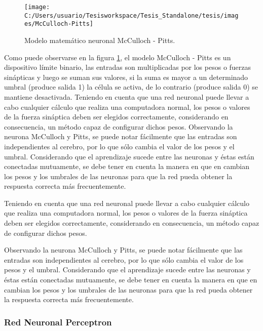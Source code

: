 \begin{figure}
\begin{centering}
\texttt{[image: C:/Users/usuario/Tesisworkspace/Tesis\_Standalone/tesis/images/McCulloch-Pitts]}
\par\end{centering}

\caption{Modelo matemático neuronal McCulloch - Pitts. \label{fig:McCulloch-Pitts}}
\end{figure}


Como puede observarse en la figura \ref{fig:McCulloch-Pitts}, el
modelo McCulloch - Pitts es un dispositivo límite binario, las entradas
son multiplicadas por los pesos o fuerzas sinápticas y luego se suman
sus valores, si la suma es mayor a un determinado umbral (produce
salida 1) la célula se activa, de lo contrario (produce salida 0)
se mantiene desactivada. Teniendo en cuenta que una red neuronal puede
llevar a cabo cualquier cálculo que realiza una computadora normal,
los pesos o valores de la fuerza sináptica deben ser elegidos correctamente,
considerando en consecuencia, un método capaz de configurar dichos
pesos. Observando la neurona McCulloch y Pitts, se puede notar fácilmente
que las entradas son independientes al cerebro, por lo que sólo cambia
el valor de los pesos y el umbral. Considerando que el aprendizaje
sucede entre las neuronas y éstas están conectadas mutuamente, se
debe tener en cuenta la manera en que en cambian los pesos y los umbrales
de las neuronas para que la red pueda obtener la respuesta correcta
más frecuentemente.

Teniendo en cuenta que una red neuronal puede llevar a cabo cualquier
cálculo que realiza una computadora normal, los pesos o valores de
la fuerza sináptica deben ser elegidos correctamente, considerando
en consecuencia, un método capaz de configurar dichos pesos.

Observando la neurona McCulloch y Pitts, se puede notar fácilmente
que las entradas son independientes al cerebro, por lo que sólo cambia
el valor de los pesos y el umbral. Considerando que el aprendizaje
sucede entre las neuronas y éstas están conectadas mutuamente, se
debe tener en cuenta la manera en que en cambian los pesos y los umbrales
de las neuronas para que la red pueda obtener la respuesta correcta
más frecuentemente. 


\subsubsection*{Red Neuronal Perceptron }


